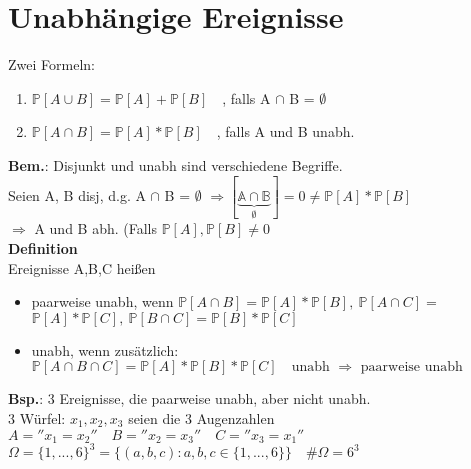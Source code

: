 
\section{Unabhängige Ereignisse}
Zwei Formeln:
\begin{enumerate}
	\item $\mathds{P}[A\cup B] = \mathds{P}[A]+\mathds{P}[B] \quad$, falls A $\cap$ B = $\emptyset$
	\item $\mathds{P}[A\cap B] = \mathds{P}[A]*\mathds{P}[B] \quad$, falls A und B unabh.
\end{enumerate}
\textbf{Bem.}: Disjunkt und unabh sind verschiedene Begriffe.\\
Seien A, B disj, d.g. A $\cap$ B = $\emptyset$ $\Rightarrow \mathds{[\underbrace{A \cap B}_\emptyset]}= 0 \neq \mathds{P}[A]*\mathds{P}[B]$\\$\Rightarrow$ A und B abh. (Falls $\mathds{P}[A], \mathds{P}[B] \neq 0$\medskip\\
\textbf{Definition}\\
Ereignisse A,B,C heißen
\begin{itemize}
	\item paarweise unabh, wenn $\mathds{P}[A\cap B] = \mathds{P}[A]*\mathds{P}[B],\: \mathds{P}[A\cap C] =$\\$ \mathds{P}[A]*\mathds{P}[C],\:\mathds{P}[B \cap C]=\mathds{P}[B]*\mathds{P}[C]$
	\item unabh, wenn zusätzlich: $\mathds{P}[A\cap B \cap C] = \mathds{P}[A]*\mathds{P}[B]*\mathds{P}[C] \quad \text{unabh } \Rightarrow \text{ paarweise unabh}$
\end{itemize}
\textbf{Bsp.}: 3 Ereignisse, die paarweise unabh, aber nicht unabh.\\
3 Würfel: $x_1,x_2,x_3$ seien die 3 Augenzahlen
\\$A = ''x_1 = x_2'' \quad B = ''x_2 = x_3'' \quad C = ''x_3 = x_1''$\smallskip\\
$\Omega = \{1,...,6\}^3 = \{(a,b,c):a,b,c \in \{1,...,6\}\} \quad \# \Omega = 6^3$\smallskip\\
